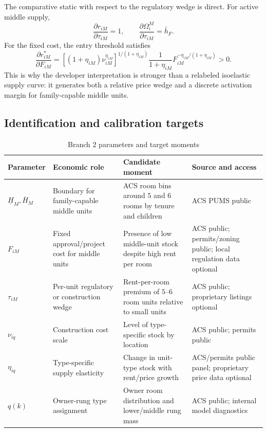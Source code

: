 \documentclass[11pt]{article}
\begin{document}
The comparative static with respect to the regulatory wedge is direct. For active middle supply,
\begin{equation}
    \frac{\partial r_{iM}}{\partial \tau_{iM}}=1,
    \qquad
    \frac{\partial \Omega^M_i}{\partial \tau_{iM}}=\bar h_F.
    \label{eq:regulatory-wedge-static}
\end{equation}
For the fixed cost, the entry threshold satisfies
\begin{equation}
    \frac{\partial r^*_{iM}}{\partial F_{iM}}
    =
    \left[(1+\eta_{iM})\nu_{iM}^{\eta_{iM}}\right]^{1/(1+\eta_{iM})}
    \frac{1}{1+\eta_{iM}}F_{iM}^{-\eta_{iM}/(1+\eta_{iM})}>0.
    \label{eq:fixed-cost-static}
\end{equation}
This is why the developer interpretation is stronger than a relabeled isoelastic supply curve: it generates both a relative price wedge and a discrete activation margin for family-capable middle units.

\subsection{Identification and calibration targets}

\begin{table}[!ht]
\centering
\caption{Branch 2 parameters and target moments}
\begin{tabular}{p{}p{}p{}p{}}
\toprule
Parameter & Economic role & Candidate moment & Source and access \\
\midrule
$\underline H_M,\overline H_M$ & Boundary for family-capable middle units & ACS room bins around $5$ and $6$ rooms by tenure and children & ACS PUMS public \\
$F_{iM}$ & Fixed approval/project cost for middle units & Presence of low middle-unit stock despite high rent per room & ACS public; permits/zoning public; local regulation data optional \\
$\tau_{iM}$ & Per-unit regulatory or construction wedge & Rent-per-room premium of $5$--$6$ room units relative to small units & ACS public; proprietary listings optional \\
$\nu_{iq}$ & Construction cost scale & Level of type-specific stock by location & ACS public; permits public \\
$\eta_{iq}$ & Type-specific supply elasticity & Change in unit-type stock with rent/price growth & ACS/permits public panel; proprietary price data optional \\
$q(k)$ & Owner-rung type assignment & Owner room distribution and lower/middle rung mass & ACS public; internal model diagnostics \\
\bottomrule
\end{tabular}
\end{table}
\end{document}
